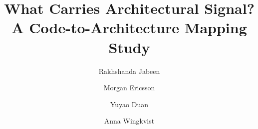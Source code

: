 \documentclass[sigconf,nonacm]{acmart}
\title{What Carries Architectural Signal? A Code-to-Architecture Mapping Study}
\author{Rakhshanda Jabeen}
\affiliation{\institution{Electrolux Professional AB}\city{Ljungby}\country{Sweden}}
\affiliation{\institution{Linnaeus University}\city{V\"axj\"o}\country{Sweden}}
\author{Morgan Ericsson}
\affiliation{\institution{Linnaeus University}\city{V\"axj\"o}\country{Sweden}}
\author{Yuyao Duan}
\affiliation{\institution{Linnaeus University}\city{V\"axj\"o}\country{Sweden}}
\author{Anna Wingkvist}
\affiliation{\institution{Linnaeus University}\city{V\"axj\"o}\country{Sweden}}
\begin{document}
\makeatletter
\renewcommand\subsubsection{%
  \@startsection{subsubsection}{3}{\z@}%
    {-1.5ex plus -0.5ex minus -0.2ex}%
    {0.5ex plus 0.2ex}%
    {\normalfont\normalsize\itshape}%
}
\let\ACM@origsubsubsection\subsubsection
\makeatother

\raggedbottom
\maketitle


%










\end{document}
